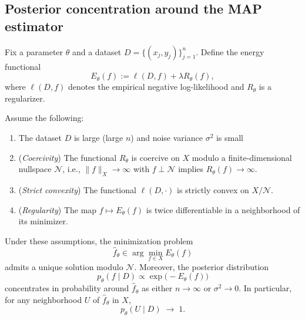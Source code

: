 



\subsection{Posterior concentration around the MAP estimator}
\label{sec:posterior-concentration}

Fix a parameter $\theta$ and a dataset $D=\{(x_j,y_j)\}_{j=1}^n$.
Define the energy functional
\[
	E_\theta(f)
	:=
	\ell(D,f)+\lambda R_\theta(f),
\]
where $\ell(D,f)$ denotes the empirical negative log-likelihood and
$R_\theta$ is a regularizer.

Assume the following:
\begin{enumerate}
	\item The dataset $D$ is large (large $n$) and noise variance $\sigma^2$ is small
	\item (\emph{Coercivity}) The functional $R_\theta$ is coercive on $X$
	      modulo a finite-dimensional nullspace $\mathcal N$, i.e.,
	      $\|f\|_X\to\infty$ with $f\perp\mathcal N$ implies $R_\theta(f)\to\infty$.
	\item (\emph{Strict convexity}) The functional $\ell(D,\cdot)$ is strictly
	      convex on $X/\mathcal N$.
	\item (\emph{Regularity}) The map $f\mapsto E_\theta(f)$ is twice
	      differentiable in a neighborhood of its minimizer.
\end{enumerate}

Under these assumptions, the minimization problem
\[
	\hat f_\theta
	\in
	\arg\min_{f\in X} E_\theta(f)
\]
admits a unique solution modulo $\mathcal N$.
Moreover, the posterior distribution
\[
	p_\theta(f\mid D)
	\propto
	\exp\!\big(-E_\theta(f)\big)
\]
concentrates in probability around $\hat f_\theta$ as either
$n\to\infty$ or $\sigma^2\to 0$.
In particular, for any neighborhood $U$ of $\hat f_\theta$ in $X$,
\[
	p_\theta(U\mid D)\;\longrightarrow\;1.
\]


